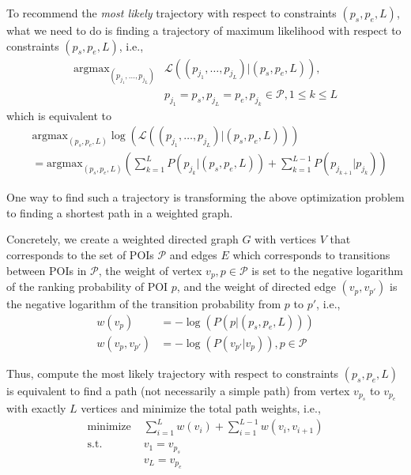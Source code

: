 \documentclass{sig-alternate-05-2015}
\begin{document}
To recommend the \textit{most likely} trajectory with respect to constraints $(p_s, p_e, L)$,
what we need to do is finding a trajectory of maximum likelihood with respect to constraints $(p_s, p_e, L)$,
i.e.,
\begin{align*}
    \text{argmax}_{(p_{j_1}, \dots, p_{j_L})} & \mathcal{L}((p_{j_1}, \dots, p_{j_L}) | (p_s, p_e, L)), \\
                                              & p_{j_1} = p_s, p_{j_L} = p_e, p_{j_k} \in \mathcal{P}, 1 \le k \le L
\end{align*}
which is equivalent to
\begin{align*}
    & \text{argmax}_{(p_s, p_e, L)} \log \left( \mathcal{L}((p_{j_1}, \dots, p_{j_L}) | (p_s, p_e, L)) \right) \\
    &= \text{argmax}_{(p_s, p_e, L)} \left( \sum_{k=1}^L P(p_{j_k} |(p_s, p_e, L)) + \sum_{k=1}^{L-1} P(p_{j_{k+1}} | p_{j_k}) \right)
\end{align*}

One way to find such a trajectory is transforming the above optimization problem to 
finding a shortest path in a weighted graph.

Concretely,
we create a weighted directed graph $G$ with vertices $V$ that corresponds to the set of POIs $\mathcal{P}$ and 
edges $E$ which corresponds to transitions between POIs in $\mathcal{P}$,
the weight of vertex $v_{p}, p \in \mathcal{P}$ is set to the negative logarithm of the ranking probability of POI $p$, 
and the weight of directed edge $(v_p, v_{p'})$ is the negative logarithm of the transition probability from $p$ to $p'$,
i.e.,
\begin{align*}
    w(v_{p})       & = -\log(P(p |(p_s, p_e, L))) \\
    w(v_p, v_{p'}) & = -\log(P(v_{p'} |v_p)), p \in \mathcal{P}
\end{align*}

Thus, compute the most likely trajectory with respect to constraints $(p_s, p_e, L)$ is
equivalent to find a path (not necessarily a simple path) from vertex $v_{p_s}$ to
$v_{p_e}$ with exactly $L$ vertices and minimize the total path weights,
i.e.,
\begin{align*}
    \text{minimize~} & \sum_{i=1}^{L} w(v_i) + \sum_{i=1}^{L-1} w(v_i, v_{i+1}) \\
    \text{s.t.~~~~~} & v_1 = v_{p_s} \\
                     & v_L = v_{p_e} 
\end{align*}
    
\end{document}
